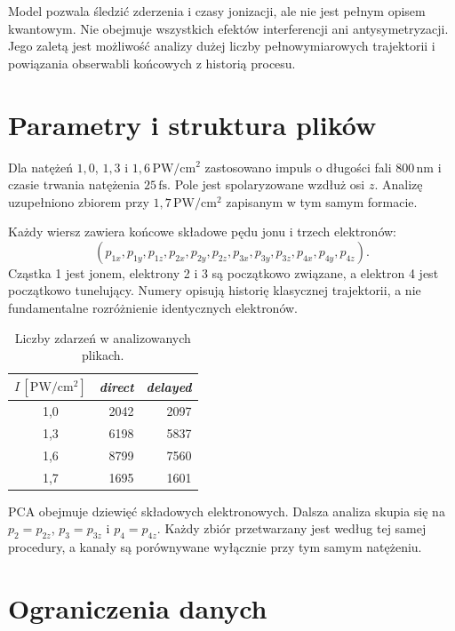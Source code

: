 \documentclass[12pt,letterpaper,oneside]{report}
\numberwithin{equation}{chapter}
\numberwithin{figure}{chapter}
\numberwithin{table}{chapter}
\newcommand{\direct}{\textit{direct}}
\newcommand{\delayed}{\textit{delayed}}
\begin{document}
Model pozwala śledzić zderzenia i czasy jonizacji, ale nie jest pełnym opisem kwantowym. Nie obejmuje wszystkich efektów interferencji ani antysymetryzacji. Jego zaletą jest możliwość analizy dużej liczby pełnowymiarowych trajektorii i powiązania obserwabli końcowych z historią procesu.

\section{Parametry i struktura plików}

Dla natężeń $1{,}0$, $1{,}3$ i $1{,}6\,\mathrm{PW/cm^2}$ zastosowano impuls o długości fali $800\,\mathrm{nm}$ i czasie trwania natężenia $25\,\mathrm{fs}$. Pole jest spolaryzowane wzdłuż osi $z$. Analizę uzupełniono zbiorem przy $1{,}7\,\mathrm{PW/cm^2}$ zapisanym w tym samym formacie.

Każdy wiersz zawiera końcowe składowe pędu jonu i trzech elektronów:
\begin{equation}
(p_{1x},p_{1y},p_{1z},p_{2x},p_{2y},p_{2z},
p_{3x},p_{3y},p_{3z},p_{4x},p_{4y},p_{4z}).
\end{equation}
Cząstka 1 jest jonem, elektrony 2 i 3 są początkowo związane, a elektron 4 jest początkowo tunelujący. Numery opisują historię klasycznej trajektorii, a nie fundamentalne rozróżnienie identycznych elektronów.

\begin{table}[htbp]
\centering
\caption{Liczby zdarzeń w analizowanych plikach.}
\label{tab:counts-all}
\begin{tabular}{crr}
\toprule
$I\,[\mathrm{PW/cm^2}]$ & \direct & \delayed\\
\midrule
1,0 & 2042 & 2097\\
1,3 & 6198 & 5837\\
1,6 & 8799 & 7560\\
1,7 & 1695 & 1601\\
\bottomrule
\end{tabular}
\end{table}

PCA obejmuje dziewięć składowych elektronowych. Dalsza analiza skupia się na $p_2=p_{2z}$, $p_3=p_{3z}$ i $p_4=p_{4z}$. Każdy zbiór przetwarzany jest według tej samej procedury, a kanały są porównywane wyłącznie przy tym samym natężeniu.

\section{Ograniczenia danych}
\end{document}

